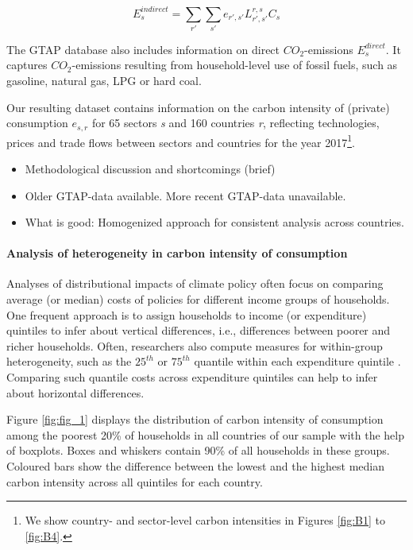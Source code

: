\documentclass[12pt, a4paper]{article}
\begin{document}
\begin{equation}
    E_{s}^{indirect} = \sum_{r'} \sum_{s'} e_{r',s'} L_{r',s'}^{r,s} C_{s}
\end{equation}

The GTAP database also includes information on direct $CO_{2}$-emissions $E_{s}^{direct}$. It captures $CO_{2}$-emissions resulting from household-level use of fossil fuels, such as gasoline, natural gas, LPG or hard coal.

Our resulting dataset contains information on the carbon intensity of (private) consumption $e_{s,r}$ for 65 sectors \textit{s} and 160 countries \textit{r}, reflecting technologies, prices and trade flows between sectors and countries for the year 2017\footnote{We show country- and sector-level carbon intensities in Figures \ref{fig:B1} to \ref{fig:B4}.}.

\begin{itemize}
    \item Methodological discussion and shortcomings (brief)
    \item Older GTAP-data available. More recent GTAP-data unavailable.
    \item What is good: Homogenized approach for consistent analysis across countries.
\end{itemize}

\paragraph{Analysis of heterogeneity in carbon intensity of consumption}


Analyses of distributional impacts of climate policy often focus on comparing average (or median) costs of policies for different income groups of households. One frequent approach is to assign households to income (or expenditure) quintiles to infer about vertical differences, i.e., differences between poorer and richer households. Often, researchers also compute measures for within-group heterogeneity, such as the $25^{th}$ or $75^{th}$ quantile within each expenditure quintile \autocite{Cronin.2019, Missbach.2023b}. Comparing such quantile costs across expenditure quintiles can help to infer about horizontal differences.

Figure \ref{fig:fig_1} displays the distribution of carbon intensity of consumption among the poorest 20\% of households in all countries of our sample with the help of boxplots. Boxes and whiskers contain 90\% of all households in these groups. Coloured bars show the difference between the lowest and the highest median carbon intensity across all quintiles for each country.
\end{document}
